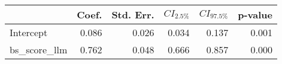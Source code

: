 \begin{tabular}{lrrrrr}
\toprule
 & Coef. & Std. Err. & $CI_{2.5\%}$ & $CI_{97.5\%}$ & p-value \\
\midrule
Intercept & 0.086 & 0.026 & 0.034 & 0.137 & 0.001 \\
bs_score_llm & 0.762 & 0.048 & 0.666 & 0.857 & 0.000 \\
\bottomrule
\end{tabular}
